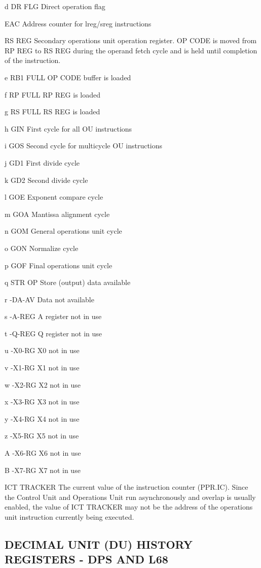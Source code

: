 d DR FLG Direct operation flag

EAC Address counter for lreg/sreg instructions

RS REG Secondary operations unit operation register. OP CODE is moved from RP
REG to RS REG during the operand fetch cycle and is held until completion of
the instruction.

e RB1 FULL OP CODE buffer is loaded

f RP FULL RP REG is loaded

g RS FULL RS REG is loaded

h GIN First cycle for all OU instructions

i GOS Second cycle for multicycle OU instructions

j GD1 First divide cycle

k GD2 Second divide cycle

l GOE Exponent compare cycle

m GOA Mantissa alignment cycle

n GOM General operations unit cycle

o GON Normalize cycle

p GOF Final operations unit cycle

q STR OP Store (output) data available

r -DA-AV Data not available

s -A-REG A register not in use

t -Q-REG Q register not in use

u -X0-RG X0 not in use

v -X1-RG X1 not in use

w -X2-RG X2 not in use

x -X3-RG X3 not in use

y -X4-RG X4 not in use

z -X5-RG X5 not in use

A -X6-RG X6 not in use

B -X7-RG X7 not in use

ICT TRACKER The current value of the instruction counter (PPR.IC). Since the
Control Unit and Operations Unit run asynchronously and overlap is usually
enabled, the value of ICT TRACKER may not be the address of the operations unit
instruction currently being executed.

\subsection{DECIMAL UNIT (DU) HISTORY REGISTERS - DPS AND L68}


